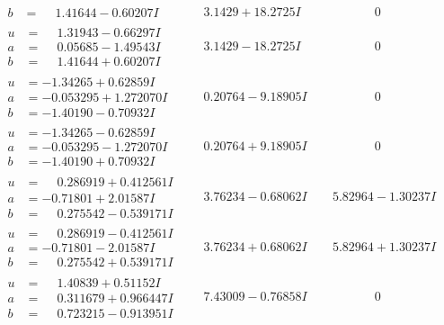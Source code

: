 \documentclass[1p]{elsarticle_modified}
\theoremstyle{definition}
\begin{document}
$$\begin{array}{c|c|c}
\begin{aligned}
b &= \phantom{-}1.41644 - 0.60207 I\end{aligned}
 & \phantom{-}3.1429 + 18.2725 I & \phantom{-0.000000 } 0 \\ \hline\begin{aligned}
u &= \phantom{-}1.31943 - 0.66297 I \\
a &= \phantom{-}0.05685 - 1.49543 I \\
b &= \phantom{-}1.41644 + 0.60207 I\end{aligned}
 & \phantom{-}3.1429 - 18.2725 I & \phantom{-0.000000 } 0 \\ \hline\begin{aligned}
u &= -1.34265 + 0.62859 I \\
a &= -0.053295 + 1.272070 I \\
b &= -1.40190 - 0.70932 I\end{aligned}
 & \phantom{-}0.20764 - 9.18905 I & \phantom{-0.000000 } 0 \\ \hline\begin{aligned}
u &= -1.34265 - 0.62859 I \\
a &= -0.053295 - 1.272070 I \\
b &= -1.40190 + 0.70932 I\end{aligned}
 & \phantom{-}0.20764 + 9.18905 I & \phantom{-0.000000 } 0 \\ \hline\begin{aligned}
u &= \phantom{-}0.286919 + 0.412561 I \\
a &= -0.71801 + 2.01587 I \\
b &= \phantom{-}0.275542 - 0.539171 I\end{aligned}
 & \phantom{-}3.76234 - 0.68062 I & \phantom{-}5.82964 - 1.30237 I \\ \hline\begin{aligned}
u &= \phantom{-}0.286919 - 0.412561 I \\
a &= -0.71801 - 2.01587 I \\
b &= \phantom{-}0.275542 + 0.539171 I\end{aligned}
 & \phantom{-}3.76234 + 0.68062 I & \phantom{-}5.82964 + 1.30237 I \\ \hline\begin{aligned}
u &= \phantom{-}1.40839 + 0.51152 I \\
a &= \phantom{-}0.311679 + 0.966447 I \\
b &= \phantom{-}0.723215 - 0.913951 I\end{aligned}
 & \phantom{-}7.43009 - 0.76858 I & \phantom{-0.000000 } 0 \\ \hline\begin{aligned}

\end{aligned}
\end{array}$$
\end{document}
